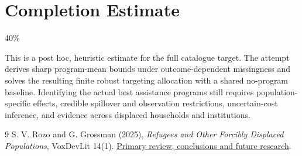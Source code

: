 \documentclass[11pt]{article}
\theoremstyle{definition}
\begin{document}
\section{Completion Estimate}
40\%

This is a post hoc, heuristic estimate for the full catalogue target.
The attempt derives sharp program-mean bounds under outcome-dependent missingness and solves the resulting finite robust targeting allocation with a shared no-program baseline. Identifying the actual best assistance programs still requires population-specific effects, credible spillover and observation restrictions, uncertain-cost inference, and evidence across displaced households and institutions.

\begin{thebibliography}{9}
 S. V. Rozo and G. Grossman (2025), \emph{Refugees and Other Forcibly Displaced Populations}, VoxDevLit 14(1). \href{https://voxdev.org/voxdevlit/refugees-and-other-forcibly-displaced-populations/conclusions-future-research}{Primary review, conclusions and future research}.
\end{thebibliography}
\end{document}

